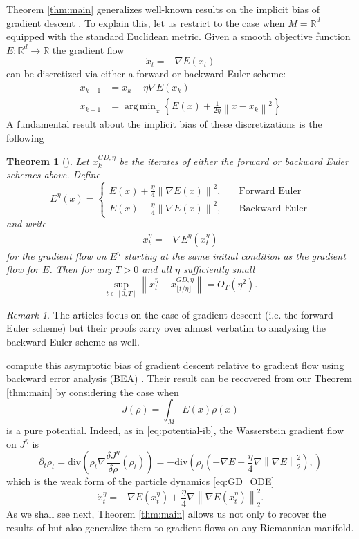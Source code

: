\documentclass[reqno,11pt,letterpaper]{amsart}
\theoremstyle{plain}
\newtheorem{theorem}{Theorem}
\theoremstyle{definition}
\theoremstyle{remark}
\newtheorem{remark}{Remark}
\DeclareMathOperator*{\argmin}{arg\,min}
\newcommand{\gives}{\rightarrow}
\newcommand{\R}{\mathbb R}
\newcommand{\lr}[1]{\left(#1\right)}
\newcommand{\norm}[1]{\left\lVert#1\right\rVert}
\newcommand{\set}[1]{\left\{#1\right\}}
\begin{document}
Theorem \ref{thm:main} generalizes well-known results on the implicit bias of gradient descent \cite{smith2021on, barrett2021implicit}. To explain this, let us restrict to the case when $M = \R^d$ equipped with the standard Euclidean metric. Given a smooth objective function $E:\R^d \gives \R$ the gradient flow
\[
\dot{x}_t = - \nabla E(x_t)
\]
can be discretized via either a forward or backward Euler scheme:
\begin{align}
    \label{eq:forward} x_{k+1} &= x_k - \eta \nabla E(x_k) \tag{Forward Euler}\\
    \label{eq:backward} x_{k+1} &=\argmin_{x} \set{E(x) + \frac{1}{2\eta}\norm{x-x_k}^2} \tag{Backward Euler}
\end{align}
A fundamental result about the implicit bias of these discretizations is the following
\begin{theorem}[\cite{smith2021on, barrett2021implicit}]\label{thm:GD}
    Let $x_k^{GD,\eta}$ be the iterates of either the forward or backward Euler schemes above. Define
    \[
    E^\eta(x) = \begin{cases}
        E(x)+\frac{\eta}{4}\norm{\nabla E(x)}^2,&\quad \text{Forward Euler}\\
        E(x)-\frac{\eta}{4}\norm{\nabla E(x)}^2,&\quad \text{Backward Euler}
    \end{cases}
    \]
    and write
    \begin{align}\label{eq:GD_ODE}
    \dot{x}_t^\eta = - \nabla E^\eta(x_t^\eta)
    \end{align}
    for the gradient flow on $E^\eta$ starting at the same initial condition as the gradient flow for $E$. Then for any $T>0$ and all $\eta$ sufficiently small 
    \[
    \sup_{t\in [0,T]} \norm{x_t^\eta - x_{\lfloor t/\eta \rfloor}^{GD,\eta}}= O_T(\eta^2).
    \]
\end{theorem}

\begin{remark}
    The articles \cite{smith2021on, barrett2021implicit} focus on the case of gradient descent (i.e. the forward Euler scheme) but their proofs carry over almost verbatim to analyzing the backward Euler scheme as well. 
\end{remark}

\cite{barrett2021implicit, smith2021on} compute this asymptotic bias of gradient descent relative to gradient flow using backward error analysis (BEA) \cite{Reich1999, CHansen2011}. Their result can be recovered from our Theorem \ref{thm:main} by considering the case when 
\[
J(\rho) = \int_M E(x) \rho(x)
\]
is a pure potential. Indeed, as in \eqref{eq:potential-ib}, the Wasserstein gradient flow on $J^\eta$ is
\[
\partial_t \rho_t  = \mathrm{div}\lr{\rho_t \nabla \frac{\delta J^{\eta}}{\delta \rho}(\rho_t)} = -\mathrm{div}\lr{\rho_t (-\nabla E +\frac{\eta}{4} \nabla \left\lVert \nabla E\right\rVert_{2}^{2}) ,}
\]
which is the weak form of the particle dynamics \eqref{eq:GD_ODE}
\[
\dot{x}^{\eta}_{t} = -\nabla E(x^{\eta}_{t}) +\frac{\eta}{4} \nabla \left\lVert \nabla E(x^{\eta}_{t}) \right\rVert_{2}^{2}.
\]
As we shall see next, Theorem \ref{thm:main} allows us not only to recover the results of \cite{smith2021on, barrett2021implicit} but also generalize them to gradient flows on any Riemannian manifold. 
\end{document}
